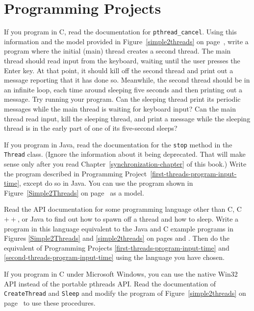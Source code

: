 \section*{Programming Projects}
\begin{chapterEnumerate}
\item\label{first-threads-program-input-time}
If
you program in C, read the documentation for
\verb|pthread_cancel|.
Using this information and the model provided in
Figure~\ref{simple2threads} on page~\pageref{simple2threads},
write a program where the initial
(main) thread creates a second thread.  The main thread should
read input from the keyboard, waiting until the user presses the Enter key.  At that point, it should kill off the
second thread and print out a message reporting that it has done so.
Meanwhile, the second thread should be in an infinite loop, each time
around sleeping five seconds and then printing out a message.  Try
running your program.  Can the sleeping thread print its periodic
messages while the main thread is waiting for keyboard input?  Can the
main thread read input, kill the sleeping thread, and print a message
while the sleeping thread is in the early part of one of its
five-second sleeps?
\item\label{second-threads-program-input-time}
If you
program in Java, read the documentation for the
\verb|stop| method in the \verb|Thread|
class.  (Ignore the information about it being deprecated.  That will
make sense only after you read Chapter~\ref{synchronization-chapter} of
this book.)  Write the program described in Programming Project~\ref{first-threads-program-input-time},
except do so in Java.  You can use the program shown in
Figure~\ref{Simple2Threads} on page~\pageref{Simple2Threads} as a model.
\item\label{third-threads-program-input-time}
Read the API documentation for some programming language other than C,
C$++$, or Java to find out how to spawn off a thread and how to
sleep.  Write a program in this language equivalent to the Java and C
example programs in Figures \ref{Simple2Threads} and
\ref{simple2threads} on pages \pageref{Simple2Threads} and
\pageref{simple2threads}.  Then do the equivalent of Programming
Projects \ref{first-threads-program-input-time} and \ref{second-threads-program-input-time} using the language you have chosen.
\item\label{win32-threads-program}
If you program in C under Microsoft Windows, you can use the
native Win32 API instead of the portable pthreads API. Read the
documentation of \verb|CreateThread| and \verb|Sleep| and modify the
program of Figure~\ref{simple2threads} on
page~\pageref{simple2threads} to use these procedures.
\end{chapterEnumerate}

